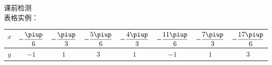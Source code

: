   \newtheorem*{Theorem}{定理}
  \makefront
\vspace{-1.5em}

\startexercise
\begin{exercise}{\heiti 课前检测}\\
  表格实例：
  \begin{center}
    \renewcommand{\arraystretch}{1.4}
    \begin{tabular}{|*{8}{c|}}
      \hline
        $x$
        &$-\dfrac{\piup}6$
        &$-\dfrac{\piup}3$
        &$-\dfrac{5\piup}6$
        &$-\dfrac{4\piup}3$
        &$-\dfrac{11\piup}6$
        &$-\dfrac{7\piup}3$
        &$-\dfrac{17\piup}6$\\
      \hline
        $y$
        &$-1$
        &$1$
        &$3$
        &$1$
        &$-1$
        &$1$
        &$3$\\
      \hline
    \end{tabular}\\
  \end{center}
\end{exercise}


